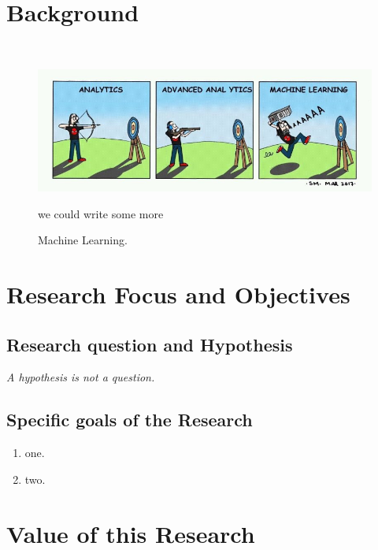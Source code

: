 \normalem
\section{Background}
\lipsum[2-4] \\


\begin{figure}
    \centering
    \includegraphics[width=\textwidth]{images/Chapter01_Intro/joke.jpg}
    \caption{Machine Learning.}
    \scriptsize{we could write some more}
    \label{fig: lung-breast-cancer}
\end{figure}


\section{Research Focus and Objectives}
\lipsum[2-4]
\subsection{Research question and Hypothesis}
\label{ResearchQuestion}
\lipsum[2-4]
\begin{tcolorbox}[colback=blue!5,colframe=blue!40!black,title=Hypothesis] %
\textit{A hypothesis is not a question.}
\end{tcolorbox}


\subsection{Specific goals of the Research}
\label{specific-goals}
\lipsum[2-4]
\begin{enumerate}
    \item one.
    \item two.
    
\end{enumerate}

\section{Value of this Research}

